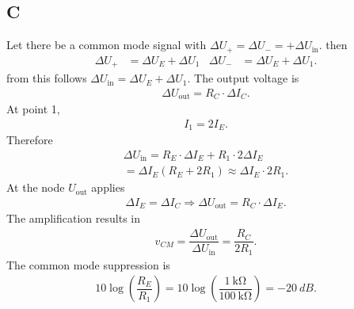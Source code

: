 \documentclass[a4paper,10pt]{article}
\numberwithin{equation}{section}
\begin{document}
\begin{multicols}{2}
        \subsection{C}
        Let there be a common mode signal with $\Delta U_+=\Delta U_-=+\Delta U_\text{in}$.
        then
        \begin{align} 
                &&&& \Delta U_+ &= \Delta U_E+\Delta U_1 & \Delta U_- &= \Delta U_E+\Delta U_1. &&&& 
        \end{align} 
        from this follows $\Delta U_\text{in}=\Delta U_E+\Delta U_1$.
        The output voltage is
        \begin{align} 
                \Delta U_\text{out}=R_C\cdot \Delta I_C
        .\end{align} 
        At point 1,
        \begin{align}
                I_1=2I_E
        .\end{align} 
        Therefore
        \begin{multline} 
                \Delta U_\text{in} = R_E\cdot \Delta I_E+R_1 \cdot 2\Delta I_E \\= \Delta I_E\left(R_E+2R_1\right)\approx \Delta I_E\cdot 2R_1.
        \end{multline} 
        At the node $U_\text{out}$ applies
        \begin{align} 
                \Delta I_E=\Delta I_C\Rightarrow \Delta U_\text{out}=R_C\cdot \Delta I_E
        .\end{align} 
        The amplification results in
        \begin{align} 
                v_{CM}=\dfrac{\Delta U_\text{out}}{\Delta U_\text{in}}=\dfrac{R_C}{2R_1}
        .\end{align} 
        The common mode suppression is
        \begin{align} 
                10\log \left(\dfrac{R_E}{R_1}\right)=10\log \left(\dfrac{\SI{1}{\kilo\ohm}}{\SI{100}{\kilo\ohm}}\right)=-\SI{20}{dB}
        .\end{align} 


\end{multicols}
\end{document}
